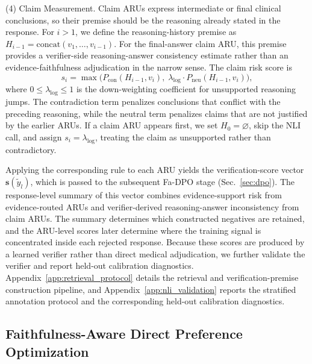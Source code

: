 \documentclass[a4paper,fleqn,doubleblind]{cas-sc}
\begin{document}
(4) Claim Measurement.
Claim ARUs express intermediate or final clinical conclusions, so their premise should be the reasoning already stated in the response. For $i>1$, we define the reasoning-history premise as $H_{i-1}=\mathrm{concat}(v_1,\dots,v_{i-1})$. For the final-answer claim ARU, this premise provides a verifier-side reasoning-answer consistency estimate rather than an evidence-faithfulness adjudication in the narrow sense. The claim risk score is
\begin{equation}
\label{eq:logic_score}
    s_i = \max \Big( P_{\text{con}}(H_{i-1}, v_i),\; \lambda_{\text{log}} \cdot P_{\text{neu}}(H_{i-1}, v_i) \Big),
\end{equation}
where $0 \le \lambda_{\text{log}} \le 1$ is the down-weighting coefficient for unsupported reasoning jumps. The contradiction term penalizes conclusions that conflict with the preceding reasoning, while the neutral term penalizes claims that are not justified by the earlier ARUs. If a claim ARU appears first, we set $H_0=\varnothing$, skip the NLI call, and assign $s_i=\lambda_{\text{log}}$, treating the claim as unsupported rather than contradictory.

Applying the corresponding rule to each ARU yields the verification-score vector $\mathbf{s}(\tilde{y}_l)$, which is passed to the subsequent Fa-DPO stage (Sec.~\ref{sec:dpo}). The response-level summary of this vector combines evidence-support risk from evidence-routed ARUs and verifier-derived reasoning-answer inconsistency from claim ARUs. The summary determines which constructed negatives are retained, and the ARU-level scores later determine where the training signal is concentrated inside each rejected response. Because these scores are produced by a learned verifier rather than direct medical adjudication, we further validate the verifier and report held-out calibration diagnostics.
Appendix~\ref{app:retrieval_protocol} details the retrieval and verification-premise construction pipeline, and Appendix~\ref{app:nli_validation} reports the stratified annotation protocol and the corresponding held-out calibration diagnostics.


\subsection{Faithfulness-Aware Direct Preference Optimization}
\end{document}
